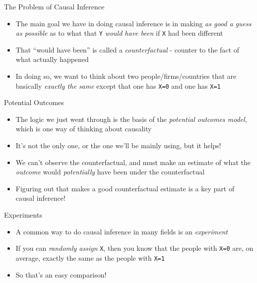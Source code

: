 \documentclass[
  ignorenonframetext,
]{beamer}
\providecommand{\tightlist}{%
  \setlength{\itemsep}{0pt}\setlength{\parskip}{0pt}}
\begin{document}
\begin{frame}[fragile]{The Problem of Causal Inference}
\label{the-problem-of-causal-inference-4}
\begin{itemize}
\tightlist
\item
  The main goal we have in doing causal inference is in making \emph{as
  good a guess as possible} as to what that \texttt{Y} \emph{would have
  been} if \texttt{X} had been different
\item
  That ``would have been'' is called a \emph{counterfactual} - counter
  to the fact of what actually happened
\item
  In doing so, we want to think about two people/firms/countries that
  are basically \emph{exactly the same} except that one has \texttt{X=0}
  and one has \texttt{X=1}
\end{itemize}
\end{frame}

\begin{frame}{Potential Outcomes}
\label{potential-outcomes}
\begin{itemize}
\tightlist
\item
  The logic we just went through is the basis of the \emph{potential
  outcomes model}, which is one way of thinking about causality
\item
  It's not the only one, or the one we'll be mainly using, but it helps!
\item
  We can't observe the counterfactual, and must make an estimate of what
  the \emph{outcome} would \emph{potentially} have been under the
  counterfactual
\item
  Figuring out that makes a good counterfactual estimate is a key part
  of causal inference!
\end{itemize}
\end{frame}

\begin{frame}[fragile]{Experiments}
\label{experiments}
\begin{itemize}
\tightlist
\item
  A common way to do causal inference in many fields is an
  \emph{experiment}
\item
  If you can \emph{randomly assign} \texttt{X}, then you know that the
  people with \texttt{X=0} are, on average, exactly the same as the
  people with \texttt{X=1}
\item
  So that's an easy comparison!
\end{itemize}
\end{frame}
\end{document}
